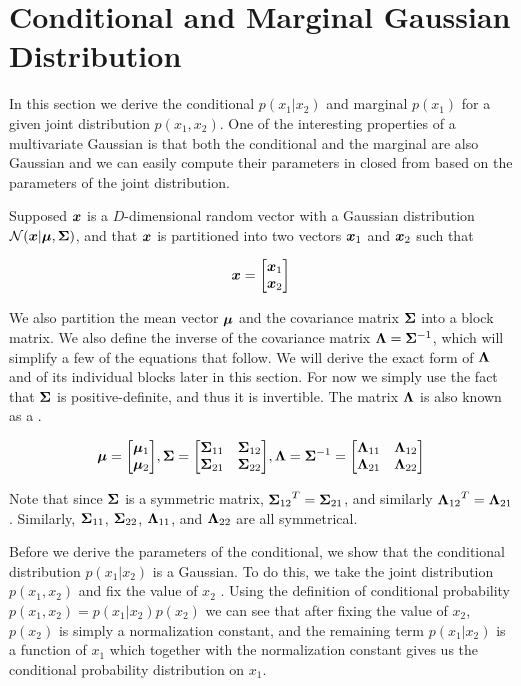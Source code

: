 \section{Conditional and Marginal Gaussian Distribution}

In this section we derive the conditional $p(x_1 | x_2)$ and marginal $p(x_1)$ for a given joint distribution $p(x_1, x_2)$. One of the interesting properties of a multivariate Gaussian is that both the conditional and the marginal are also Gaussian and we can easily compute their parameters in closed from based on the parameters of the joint distribution.

Supposed ${\bm{x}}$ is a $D$-dimensional random vector with a Gaussian distribution ${\mathcal{N}}({\bm{x}} | {\bm{\mu}}, {\bm{\Sigma}})$, and that ${\bm{x}}$ is partitioned into two vectors ${\bm{x}}_1$ and ${\bm{x}}_2$ such that

\begin{equation}
{\bm{x}} = {\begin{bmatrix} {\bm{x}}_1 \\ {\bm{x}}_2 \end{bmatrix}}
\end{equation}

We also partition the mean vector ${\bm{\mu}}$ and the covariance matrix ${\bm{\Sigma}}$ into a block matrix. We also define the inverse of the covariance matrix ${\bm{\Lambda}} = {\bm{\Sigma}}^{-1}$, which will simplify a few of the equations that follow. We will derive the exact form of ${\bm{\Lambda}}$ and of its individual blocks later in this section. For now we simply use the fact that ${\bm{\Sigma}}$ is positive-definite, and thus it is invertible. The matrix ${\bm{\Lambda}}$ is also known as a .

\begin{equation}
{\bm{\mu}} = {\begin{bmatrix} {\bm{\mu}}_1 \\ {\bm{\mu}}_2 \end{bmatrix}},
{\bm{\Sigma}} = {\begin{bmatrix} {{\bm{\Sigma}}_{11}} & {{\bm{\Sigma}}_{12}} \\ {{\bm{\Sigma}}_{21}} & {{\bm{\Sigma}}_{22}} \end{bmatrix}}, {\bm{\Lambda}} = {\bm{\Sigma}}^{-1} = {\begin{bmatrix} {{\bm{\Lambda}}_{11}} & {{\bm{\Lambda}}_{12}} \\ {{\bm{\Lambda}}_{21}} & {{\bm{\Lambda}}_{22}} \end{bmatrix}} \label{eq:mvn-partition}
\end{equation}

Note that since ${\bm{\Sigma}}$ is a symmetric matrix, ${{\bm{\Sigma}}_{12}}^T = {{\bm{\Sigma}}_{21}}$, and similarly ${{\bm{\Lambda}}_{12}}^T = {{\bm{\Lambda}}_{21}}$. Similarly, ${{\bm{\Sigma}}_{11}}$, ${{\bm{\Sigma}}_{22}}$, ${{\bm{\Lambda}}_{11}}$, and ${{\bm{\Lambda}}_{22}}$ are all symmetrical.

Before we derive the parameters of the conditional, we show that the conditional distribution $p(x_1 | x_2)$ is a Gaussian. To do this, we take the joint distribution $p(x_1, x_2)$ and fix the value of $x_2$ \citep{bishop2016pattern}. Using the definition of conditional probability $p(x_1, x_2) = p(x_1 | x_2) p(x_2)$ we can see that after fixing the value of $x_2$, $p(x_2)$ is simply a normalization constant, and the remaining term $p(x_1 | x_2)$ is a function of $x_1$ which together with the normalization constant gives us the conditional probability distribution on $x_1$.

